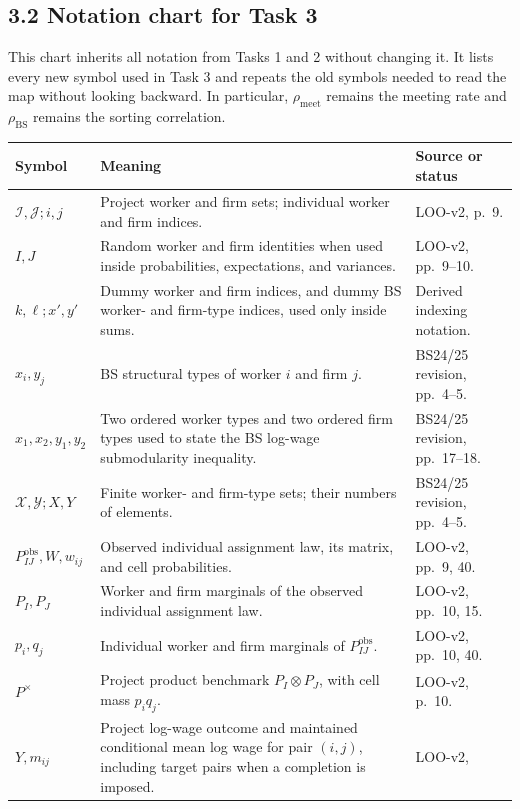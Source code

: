 \documentclass[11pt]{article}
\begin{document}
\subsection{3.2 Notation chart for Task 3}

This chart inherits all notation from Tasks 1 and 2 without changing it.  It
lists every new symbol used in Task 3 and repeats the old symbols needed to
read the map without looking backward.  In particular,
\(\rho_{\mathrm{meet}}\) remains the meeting rate and
\(\rho_{\mathrm{BS}}\) remains the sorting correlation.

\begin{longtable}{p{}p{}p{}}
\textbf{Symbol} & \textbf{Meaning} & \textbf{Source or status} \\
\hline
\(\mathcal I,\mathcal J;i,j\) & Project worker and firm sets; individual
worker and firm indices. & LOO-v2, p.\ 9. \\
\(I,J\) & Random worker and firm identities when used inside probabilities,
expectations, and variances. & LOO-v2, pp.\ 9--10. \\
\(k,\ell;x',y'\) & Dummy worker and firm indices, and dummy BS worker- and
firm-type indices, used only inside sums. & Derived indexing notation. \\
\(x_i,y_j\) & BS structural types of worker \(i\) and firm \(j\). &
BS24/25 revision, pp.\ 4--5. \\
\(x_1,x_2,y_1,y_2\) & Two ordered worker types and two ordered firm types used
to state the BS log-wage submodularity inequality. & BS24/25 revision,
pp.\ 17--18. \\
\(\mathcal X,\mathcal Y;X,Y\) & Finite worker- and firm-type sets; their
numbers of elements. & BS24/25 revision, pp.\ 4--5. \\
\(P^{\mathrm{obs}}_{IJ},W,w_{ij}\) & Observed individual assignment law, its
matrix, and cell probabilities. & LOO-v2, pp.\ 9, 40. \\
\(P_I,P_J\) & Worker and firm marginals of the observed individual assignment
law. & LOO-v2, pp.\ 10, 15. \\
\(p_i,q_j\) & Individual worker and firm marginals of
\(P^{\mathrm{obs}}_{IJ}\). & LOO-v2, pp.\ 10, 40. \\
\(P^\times\) & Project product benchmark
\(P_I\otimes P_J\), with cell mass \(p_iq_j\). & LOO-v2, p.\ 10. \\
\(Y,m_{ij}\) & Project log-wage outcome and maintained conditional mean log
wage for pair
\((i,j)\), including target pairs when a completion is imposed. & LOO-v2,

\end{longtable}
\end{document}
